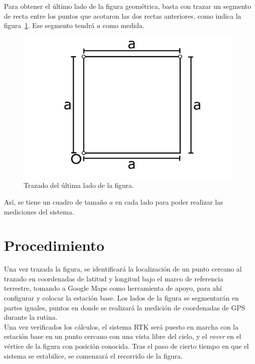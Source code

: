 Para obtener el último lado de la figura geométrica, basta con trazar un segmento de recta entre los puntos que acotaron las dos rectas anteriores, como indica la figura~\ref{fig:TrazFig10}. Ese segmento tendrá $a$ como medida.

\begin{figure}[H]
\centering
\includegraphics[scale=0.75]{Figures/Cuad10}
\caption[Trazado del último lado de la figura.]{Trazado del última lado de la figura.}
\label{fig:TrazFig10}
\end{figure}

Así, se tiene un cuadro de tamaño $a$ en cada lado para poder realizar las mediciones del sistema.

\section{Procedimiento}

Una vez trazada la figura, se identificará la localización de un punto cercano al trazado en coordenadas de latitud y longitud bajo el marco de referencia terrestre, tomando a Google Maps como herramienta de apoyo, para ahí configurar y colocar la estación base. Los lados de la figura se segmentarán en partes iguales, puntos en donde se realizará la medición de coordenadas de GPS durante la rutina.\\

Una vez verificados los cálculos, el sistema RTK será puesto en marcha con la estación base en un punto cercano con una vista libre del cielo, y el \textit{rover} en el vértice de la figura con posición conocida. Tras el paso de cierto tiempo en que el sistema se estabilice, se comenzará el recorrido de la figura.\\

